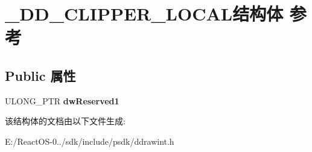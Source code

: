 \hypertarget{struct___d_d___c_l_i_p_p_e_r___l_o_c_a_l}{}\section{\+\_\+\+D\+D\+\_\+\+C\+L\+I\+P\+P\+E\+R\+\_\+\+L\+O\+C\+A\+L结构体 参考}
\label{struct___d_d___c_l_i_p_p_e_r___l_o_c_a_l}
\subsection*{Public 属性}
\begin{DoxyCompactItemize}
\item 
\mbox{\label{struct___d_d___c_l_i_p_p_e_r___l_o_c_a_l_abcb1a2ad6122292cdefb69d3b2bdbb83}} 
U\+L\+O\+N\+G\+\_\+\+P\+TR {\bfseries dw\+Reserved1}
\end{DoxyCompactItemize}


该结构体的文档由以下文件生成\+:\begin{DoxyCompactItemize}
\item 
E\+:/\+React\+O\+S-\/0../sdk/include/psdk/ddrawint.\+h\end{DoxyCompactItemize}
